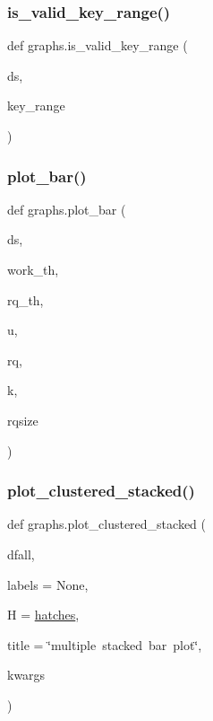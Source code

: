 \subsubsection{\texorpdfstring{is\+\_\+valid\+\_\+key\+\_\+range()}{is\_valid\_key\_range()}}
{\footnotesize\ttfamily def graphs.\+is\+\_\+valid\+\_\+key\+\_\+range (\begin{DoxyParamCaption}\item[{}]{ds,  }\item[{}]{key\+\_\+range }\end{DoxyParamCaption})}

\mbox{\label{namespacegraphs_abb9e760790f5dff6bdc43949da546abd}} 
\subsubsection{\texorpdfstring{plot\+\_\+bar()}{plot\_bar()}}
{\footnotesize\ttfamily def graphs.\+plot\+\_\+bar (\begin{DoxyParamCaption}\item[{}]{ds,  }\item[{}]{work\+\_\+th,  }\item[{}]{rq\+\_\+th,  }\item[{}]{u,  }\item[{}]{rq,  }\item[{}]{k,  }\item[{}]{rqsize }\end{DoxyParamCaption})}

\mbox{\label{namespacegraphs_a35693253c342185fb0433036ca195851}} 
\subsubsection{\texorpdfstring{plot\+\_\+clustered\+\_\+stacked()}{plot\_clustered\_stacked()}}
{\footnotesize\ttfamily def graphs.\+plot\+\_\+clustered\+\_\+stacked (\begin{DoxyParamCaption}\item[{}]{dfall,  }\item[{}]{labels = {\ttfamily None},  }\item[{}]{H = {\ttfamily \hyperlink{namespacegraphs_a7834f87f73120010330fe10b311d2274}{hatches}},  }\item[{}]{title = {\ttfamily \char`\"{}multiple~stacked~bar~plot\char`\"{}},  }\item[{}]{kwargs }\end{DoxyParamCaption})}

